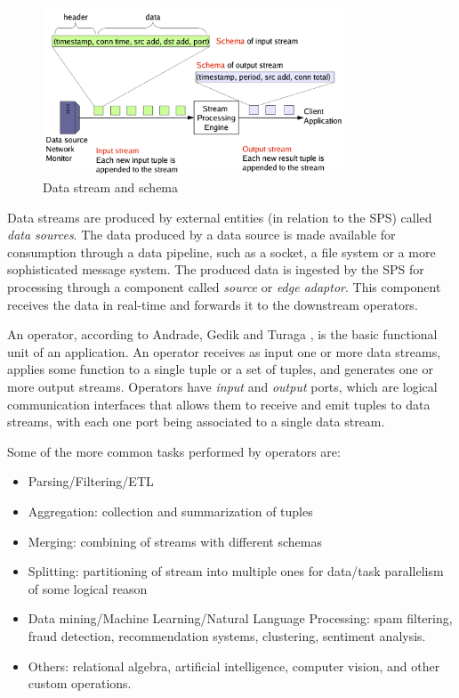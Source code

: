 \documentclass[ppgc,diss,english]{iiufrgs}
\begin{document}
\begin{figure}[!ht]
	\centering
	\includegraphics[width=0.8\textwidth]{images/streams_schemas.png}
	\caption[Data stream and schema]{Data stream and schema \cite{balazinska2005fault}}
	\label{fig:sps_data_stream}
\end{figure}

Data streams are produced by external entities (in relation to the SPS) called \emph{data sources}. The data produced by a data source is made available for consumption through a data pipeline, such as a socket, a file system or a more sophisticated message system. The produced data is ingested by the SPS for processing through a component called \emph{source} or \emph{edge adaptor}. This component receives the data in real-time and forwards it to the downstream operators.

An operator, according to Andrade, Gedik and Turaga \cite{andrade2014fundamentals}, is the basic functional unit of an application. An operator receives as input one or more data streams, applies some function to a single tuple or a set of tuples, and generates one or more output streams. Operators have \emph{input} and \emph{output} ports, which are logical communication interfaces that allows them to receive and emit tuples to data streams, with each one port being associated to a single data stream.

Some of the more common tasks performed by operators are:

\begin{itemize}
\item Parsing/Filtering/ETL
\item Aggregation: collection and summarization of tuples
\item Merging: combining of streams with different schemas
\item Splitting: partitioning of stream into multiple ones for data/task parallelism of some logical reason
\item Data mining/Machine Learning/Natural Language Processing: spam filtering, fraud detection, recommendation systems, clustering, sentiment analysis.
\item Others: relational algebra, artificial intelligence, computer vision, and other custom operations.
\end{itemize}
\end{document}
